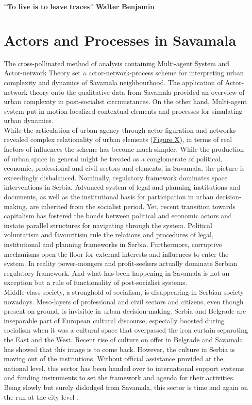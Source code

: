 \documentclass[11pt]{report}
\begin{document}
{\textbf{"To live is to leave traces" Walter Benjamin}

\section{Actors and Processes in Savamala}

The cross-pollinated method of analysis containing Multi-agent System and Actor-network Theory set a actor-network-process scheme for interpreting urban complexity and dynamics of Savamala neighbourhood.
The application of Actor-network theory onto the qualitative data from Savamala provided an overview of urban complexity in post-socialist circumstances. On the other hand, Multi-agent system put in motion localized contextual elements and processes for simulating urban dynamics.
\\

While the articulation of urban agency through actor figuration and networks revealed complex relationality of urban elements (\href{ANT diagram}{Figure X}), in terms of real factors of influences the scheme has become much simpler.
While the production of urban space in general might be treated as a conglomerate of political, economic, professional and civil sectors and elements, in Savamala, the picture is exceedingly disbalanced.
Nominally, regulatory framework dominates space interventions in Serbia.
Advanced system of legal and planning institutions and documents, as well as the institutional basis for participation in urban decision-making, are inherited from the socialist period.
Yet, recent transition towards capitalism has fostered the bonds between political and economic actors and instate parallel structures for navigating through the system.
Political voluntarism and favouritism rule the relations and procedures of legal, institutional and planning frameworks in Serbia.
Furthermore, corruptive mechanisms open the floor for external interests and influences to enter the system.
In reality power-mongers and profit-seekers actually dominate Serbian regulatory framework. 
And what has been happening in Savamala is not an exception but a rule of functionality of post-socialist systems.
\\

Middle-class society, a stronghold of socialism, is disappearing in Serbian society nowadays. 
Meso-layers of professional and civil sectors and citizens, even though present on ground, is invisible in urban decision-making.
Serbia and Belgrade are inseparable part of European cultural discourse, especially boosted during socialism when it was a cultural space that overpassed the iron curtain separating the East and the West.
Recent rise of culture on offer in Belgrade and Savamala has showed that this image is to come back.
However, the culture in Serbia is moving out of the institutions.
Without official  assistance provided at the national level, this sector has been handed over to international support systems and funding instruments to set the framework and agenda for their activities. Being slowly but surely dislodged from Savamala, this sector is time and again on the run at the city level .
\\

}
\end{document}
